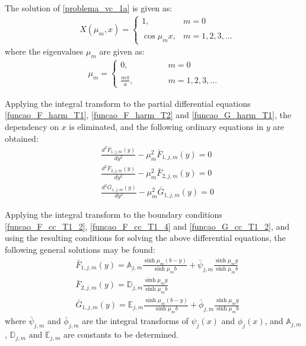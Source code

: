 \documentclass[conference,compsoc,fleqn]{IEEEtran}
\begin{document}
The solution of \eqref{problema_vc_1a} is given as\cite{livro_integral_transforms_cotta}:
\begin{align}
& X(\mu_m, x) = \left\lbrace
\begin{array}{ll}
1, & m = 0 \\ \\
\cos \mu_m x, & m = 1,2,3,\ldots
\end{array}
\right . \label{definicao_das_autofuncoes}
\end{align}
where the eigenvalues $\mu_m$ are given as\cite{livro_integral_transforms_cotta}:
\begin{align}
\mu_m = \left\lbrace
\begin{array}{ll}
0, \quad\quad\quad\quad & m = 0 \\ \\
\frac{m\pi}{a}, & m = 1,2,3,\ldots
\end{array}
\right.
\end{align}

Applying the integral transform to the partial differential equations \eqref{funcao_F_harm_T1}, \eqref{funcao_F_harm_T2} and \eqref{funcao_G_harm_T1}, the dependency on $x$ is eliminated, and the following ordinary equations in $y$ are obtained:
\begin{align}
& \frac{d^2 \bar{F}_{1,j,m}(y)}{d y^2}
-
\mu_m^2 \bar{F}_{1,j,m}(y) = 0 \label{eq_dif_ord_F1} \\
& \frac{d^2 \bar{F}_{2,j,m}(y)}{d y^2}
-
\mu_m^2 \bar{F}_{2,j,m}(y) = 0 \label{eq_dif_ord_F2} \\
& \frac{d^2 \bar{G}_{1,j,m}(y)}{d y^2}
-
\mu_m^2 \bar{G}_{1,j,m}(y) = 0 \label{eq_dif_ord_G1}
\end{align}

Applying the integral transform to the boundary conditions \eqref{funcao_F_cc_T1_2}, \eqref{funcao_F_cc_T1_4} and \eqref{funcao_G_cc_T1_2}, and using the resulting conditions for solving the above differential equations, the following general solutions may be found\cite{livro_boyce}:
\begin{align}
& \bar{F}_{1,j,m}(y) = \mathbb{A}_{j,m} \frac{\sinh\mu_m (b - y)}{\sinh\mu_m b} +	\bar{\psi}_{j, m}\frac{\sinh\mu_m y}{\sinh\mu_m b} \label{solucao_temporaria_F1} \\
& \bar{F}_{2,j,m}(y) = \mathbb{D}_{j,m}\frac{\sinh\mu_m y}{\sinh\mu_m b} \label{solucao_temporaria_F2} \\
& \bar{G}_{1,j,m}(y) = \mathbb{E}_{j,m} \frac{\sinh\mu_m (b - y)}{\sinh\mu_m b} +\bar{\phi}_{j, m}\frac{\sinh\mu_m y}{\sinh\mu_m b} \label{solucao_temporaria_G1}
\end{align}
where $\bar{\psi}_{j, m}$ and $\bar{\phi}_{j, m}$ are the integral transforms of $\psi_j(x)$ and $\phi_j(x)$, and $\mathbb{A}_{j,m}$, $\mathbb{D}_{j,m}$ and $\mathbb{E}_{j,m}$ are constants to be determined.
\end{document}
